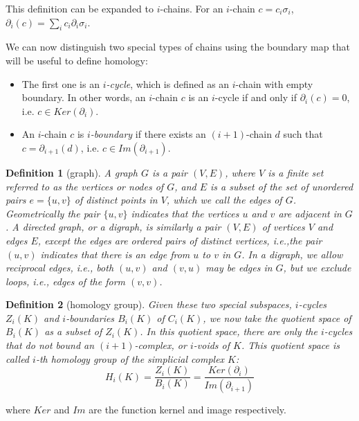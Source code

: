 \documentclass{article}
\newtheorem{definition}{Definition}
\begin{document}
This definition can be expanded to $i$-chains. For an $i$-chain $c = c_i \sigma_i$, $\partial_i(c) = \sum_i c_i \partial_i \sigma_i$.

We can now distinguish two special types of chains using the boundary map that will be useful to define homology:
\begin{itemize}
\item The first one is an \textit{$i$-cycle}, which is defined as an $i$-chain with empty boundary. In other words, an $i$-chain $c$ is an $i$-cycle if and only if $\partial_i(c) = 0$, i.e. $c \in Ker(\partial_i)$.
\item An $i$-chain $c$ is \textit{$i$-boundary} if there
exists an $(i + 1)$-chain $d$ such that $c = \partial_{i+1}(d)$, i.e. $c \in Im(\partial_{i+1})$.
\end{itemize}


\begin{definition}[graph]
A \textit{graph} $G$ is a pair $(V,E)$, where $V$ is a finite set referred to as the vertices or nodes of $G$, and $E$ is a subset of the set of unordered pairs $e=\{u,v\}$ of distinct points in $V$, which we call the edges of $G$. Geometrically the pair $\{u,v\}$ indicates that the vertices $u$ and $v$ are adjacent in $G$. A directed graph, or a digraph, is similarly a pair $(V,E)$ of vertices $V$ and edges $E$, except the edges are ordered pairs of distinct vertices, i.e.,the pair $(u,v)$ indicates that there is an edge from $u$ to $v$ in $G$. In a digraph, we allow reciprocal edges, i.e., both $(u,v)$ and $(v,u)$ may be edges in $G$, but we exclude loops, i.e., edges of the form $(v,v)$.
\end{definition}

\begin{definition}[homology group]
Given these two special subspaces, $i$-cycles $Z_i(K)$ and $i$-boundaries $B_i(K)$ of $C_i(K)$, we now take the quotient space of $B_i(K)$ as a subset of $Z_i(K)$. In this quotient space, there are only the $i$-cycles that do not bound an $(i+1)$-complex, or $i$-voids of $K$. This quotient space is called $i$-th homology group of the simplicial complex $K$:
\begin{equation}
H_i(K) = \frac{Z_i(K)}{B_i(K)} = \frac{Ker(\partial_i)}{Im(\partial_{i+1})}
\end{equation}
\end{definition}
where $Ker$ and $Im$ are the function kernel and image respectively.
\end{document}
